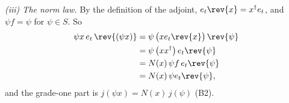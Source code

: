 \emph{(iii) The norm law.}  By the definition of the adjoint, $e_{t}\rev{x} = x^{\dagger}e_{t}$, and $\psi f = \psi$ for $\psi \in S$. So
\begin{align*}
\psi x\,e_{t}\,\rev{(\psi x)} &= \psi\,\bigl(x e_{t}\rev{x}\bigr)\,\rev{\psi} \\
&= \psi\,\bigl(xx^{\dagger}\bigr)\,e_{t}\rev{\psi} \\
&= N(x)\,\psi f\,e_{t}\rev{\psi} \\
&= N(x)\,\psi e_{t}\rev{\psi},
\end{align*}
and the grade-one part is $j(\psi x) = N(x)\,j(\psi)$ (B2).
